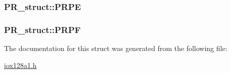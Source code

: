 \hypertarget{struct_p_r__struct_a7e9e5ab03b925dff588a2a9b03c008dd}{
\subsubsection[{PRPE}]{ {\bf PR\_\-struct::PRPE}}}
\label{struct_p_r__struct_a7e9e5ab03b925dff588a2a9b03c008dd}
\hypertarget{struct_p_r__struct_a7c5a1e0e455d902eb9a093f37e63a12d}{
\subsubsection[{PRPF}]{ {\bf PR\_\-struct::PRPF}}}
\label{struct_p_r__struct_a7c5a1e0e455d902eb9a093f37e63a12d}


The documentation for this struct was generated from the following file:\begin{DoxyCompactItemize}
\item 
\hyperlink{iox128a1_8h}{iox128a1.h}\end{DoxyCompactItemize}
